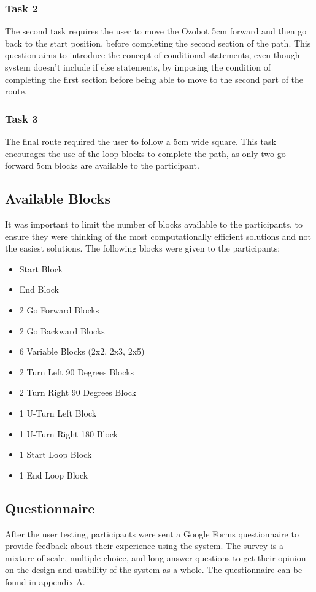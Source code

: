 \documentclass[oneside,%
                    author={Malak Hajji},
                    degree={BSc},
                    title={Designing An Accessible Computational Toolkit For Students},
                  subtitle={With Mixed Visual Abilities}]{dissertation}
\begin{document}
\subsubsection{Task 2}
The second task requires the user to move the Ozobot 5cm forward and then go back to the start position, before completing the second section of the path. This question aims to introduce the concept of conditional statements, even though system doesn't include if else statements, by imposing the condition of completing the first section before being able to move to the second part of the route.
\subsubsection{Task 3}
The final route required the user to follow a 5cm wide square. This task encourages the use of the loop blocks to complete the path, as only two go forward 5cm blocks are available to the participant.
\subsection{Available Blocks}
It was important to limit the number of blocks available to the participants, to ensure they were thinking of the most computationally efficient solutions and not the easiest solutions. 
The following blocks were given to the participants:
\begin{itemize}
    \item  Start Block
    \item End Block
    \item 2 Go Forward Blocks
    \item 2 Go Backward Blocks
    \item 6 Variable Blocks (2x2, 2x3, 2x5)
    \item 2 Turn Left 90 Degrees Blocks
    \item 2 Turn Right 90 Degrees Block
    \item 1 U-Turn Left Block
    \item 1 U-Turn Right 180 Block
    \item 1 Start Loop Block
    \item 1 End Loop Block
\end{itemize}

\subsection{Questionnaire}
After the user testing, participants were sent a Google Forms questionnaire to provide feedback about their experience using the system. The survey is a mixture of scale, multiple choice, and long answer questions to get their opinion on the design and usability of the system as a whole. The questionnaire can be found in appendix A.
\end{document}
